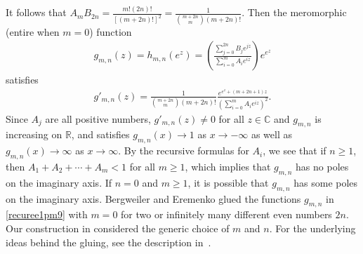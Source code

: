\documentclass[12pt]{amsart}
\numberwithin{equation}{section}
\begin{document}
It follows that $A_{m}B_{2n}=\frac{m!(2n)!}{[(m+2n)!]^2}=\frac{1}{\binom{m+2n}{m}(m+2n)!}$.
Then the meromorphic (entire when $m=0$) function
\begin{equation}\label{recuree1pm9}
\begin{split}
g_{m,n}(z)=h_{m,n}(e^z)=\left(\frac{\sum_{j=0}^{2n}B_je^{jz}}{\sum_{i=0}^{m}A_ie^{iz}}\right)e^{e^{z}}
\end{split}
\end{equation}
satisfies
\begin{equation}\label{recuree1pm10}
\begin{split}
g'_{m,n}(z)=\frac{1}{\binom{m+2n}{m}(m+2n)!}\frac{e^{e^{z}+(m+2n+1)z}}{\left(\sum_{i=0}^{m}A_ie^{iz}\right)^2}.
\end{split}
\end{equation}
Since $A_j$ are all positive numbers, $g'_{m,n}(z)\not=0$ for all $z\in \mathbb{C}$ and $g_{m,n}$ is increasing on $\mathbb{R}$, and satisfies $g_{m,n}(x)\to 1$ as $x\to -\infty$ as well as $g_{m,n}(x)\to \infty$ as $x\to \infty$. By the recursive formulas for $A_i$, we see that if $n\geq 1$, then $A_1+A_2+\cdots+A_{m}<1$ for all $m\geq 1$, which implies that $g_{m,n}$ has no poles on the imaginary axis. If $n=0$ and $m\geq 1$, it is possible that $g_{m,n}$ has some poles on the imaginary axis. Bergweiler and Eremenko glued the functions $g_{m,n}$ in \eqref{recuree1pm9} with $m=0$ for two or infinitely many different even numbers $2n$. Our construction in \cite{Zhang2024} considered the generic choice of $m$ and $n$. For the underlying ideas behind the gluing, see the description in~\cite[Section~2]{Bergweilereremenko2019}.
\end{document}
